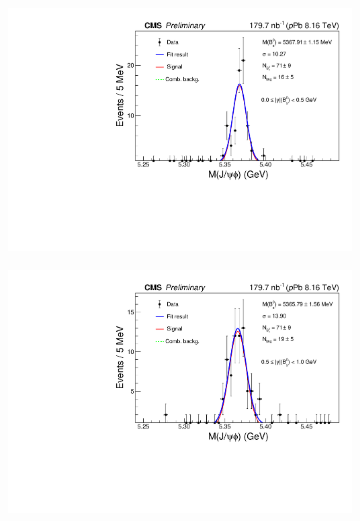 \begin{figure}[htp!]
	\centering
	\centering
	\begin{subfigure}[b]{0.475\textwidth}
		\centering
		\includegraphics[width=\textwidth]{MainContent/Figs/mass/mass_BsFit_ybins_sysbkg_0.0_0.5.PDF}
		\caption{}%
	\end{subfigure}
	\hfill
	\begin{subfigure}[b]{0.475\textwidth}
		\centering
		\includegraphics[width=\textwidth]{MainContent/Figs/mass/mass_BsFit_ybins_sysbkg_0.5_1.0.PDF}
		\caption{}%
		

\end{subfigure}
\end{figure}
